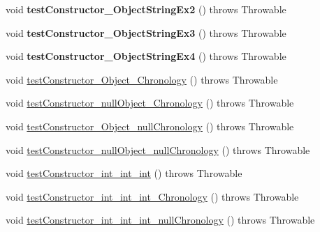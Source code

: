 \begin{DoxyCompactItemize}
\item 
\hypertarget{classorg_1_1joda_1_1time_1_1_test_year_month_day___constructors_adc39537d4303a61efe7f7944a428454d}{void {\bfseries test\-Constructor\-\_\-\-Object\-String\-Ex2} ()  throws Throwable }\label{classorg_1_1joda_1_1time_1_1_test_year_month_day___constructors_adc39537d4303a61efe7f7944a428454d}

\item 
\hypertarget{classorg_1_1joda_1_1time_1_1_test_year_month_day___constructors_a7c9bc3a28578dc2047785bedf9208c25}{void {\bfseries test\-Constructor\-\_\-\-Object\-String\-Ex3} ()  throws Throwable }\label{classorg_1_1joda_1_1time_1_1_test_year_month_day___constructors_a7c9bc3a28578dc2047785bedf9208c25}

\item 
\hypertarget{classorg_1_1joda_1_1time_1_1_test_year_month_day___constructors_a7b3227b6664e05a723569b0fcacf4b22}{void {\bfseries test\-Constructor\-\_\-\-Object\-String\-Ex4} ()  throws Throwable }\label{classorg_1_1joda_1_1time_1_1_test_year_month_day___constructors_a7b3227b6664e05a723569b0fcacf4b22}

\item 
void \hyperlink{classorg_1_1joda_1_1time_1_1_test_year_month_day___constructors_a31b32ccc7fb47035c598643115176008}{test\-Constructor\-\_\-\-Object\-\_\-\-Chronology} ()  throws Throwable 
\item 
void \hyperlink{classorg_1_1joda_1_1time_1_1_test_year_month_day___constructors_a96368612f0063f6bb6c39abcc9c439ae}{test\-Constructor\-\_\-null\-Object\-\_\-\-Chronology} ()  throws Throwable 
\item 
void \hyperlink{classorg_1_1joda_1_1time_1_1_test_year_month_day___constructors_ade70cb71a252d2a4d3ad7962c07d1550}{test\-Constructor\-\_\-\-Object\-\_\-null\-Chronology} ()  throws Throwable 
\item 
void \hyperlink{classorg_1_1joda_1_1time_1_1_test_year_month_day___constructors_a3dd3fd8d9503d7758388c26c9376ccad}{test\-Constructor\-\_\-null\-Object\-\_\-null\-Chronology} ()  throws Throwable 
\item 
void \hyperlink{classorg_1_1joda_1_1time_1_1_test_year_month_day___constructors_a905d1ea752b73f86b411020a971d4c3b}{test\-Constructor\-\_\-int\-\_\-int\-\_\-int} ()  throws Throwable 
\item 
void \hyperlink{classorg_1_1joda_1_1time_1_1_test_year_month_day___constructors_ac16d5fd952cd07a49b0e316c6d7cc6d5}{test\-Constructor\-\_\-int\-\_\-int\-\_\-int\-\_\-\-Chronology} ()  throws Throwable 
\item 
void \hyperlink{classorg_1_1joda_1_1time_1_1_test_year_month_day___constructors_aaaec8dfbb4483bffd72b761105ea6a67}{test\-Constructor\-\_\-int\-\_\-int\-\_\-int\-\_\-null\-Chronology} ()  throws Throwable 
\end{DoxyCompactItemize}
